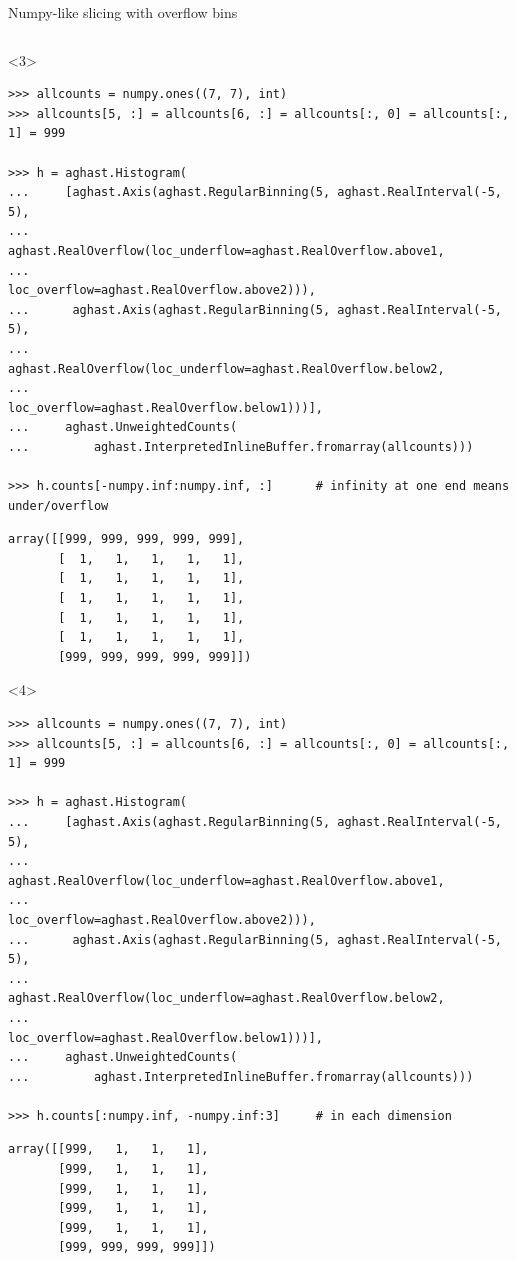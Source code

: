 \documentclass[aspectratio=169]{beamer}
\begin{document}
\begin{frame}[fragile]{Numpy-like slicing with overflow bins}
\begin{onlyenv}
\begin{verbatim}
\end{verbatim}
\end{onlyenv}
\begin{onlyenv}<3>
\begin{verbatim}
>>> allcounts = numpy.ones((7, 7), int)
>>> allcounts[5, :] = allcounts[6, :] = allcounts[:, 0] = allcounts[:, 1] = 999

>>> h = aghast.Histogram(
...     [aghast.Axis(aghast.RegularBinning(5, aghast.RealInterval(-5, 5),
...                  aghast.RealOverflow(loc_underflow=aghast.RealOverflow.above1,
...                                      loc_overflow=aghast.RealOverflow.above2))),
...      aghast.Axis(aghast.RegularBinning(5, aghast.RealInterval(-5, 5),
...                  aghast.RealOverflow(loc_underflow=aghast.RealOverflow.below2,
...                                      loc_overflow=aghast.RealOverflow.below1)))],
...     aghast.UnweightedCounts(
...         aghast.InterpretedInlineBuffer.fromarray(allcounts)))

>>> h.counts[-numpy.inf:numpy.inf, :]      # infinity at one end means under/overflow
\end{verbatim}
\begin{verbatim}
array([[999, 999, 999, 999, 999], 
       [  1,   1,   1,   1,   1], 
       [  1,   1,   1,   1,   1], 
       [  1,   1,   1,   1,   1], 
       [  1,   1,   1,   1,   1], 
       [  1,   1,   1,   1,   1], 
       [999, 999, 999, 999, 999]])
\end{verbatim}
\end{onlyenv}
\begin{onlyenv}<4>
\begin{verbatim}
>>> allcounts = numpy.ones((7, 7), int)
>>> allcounts[5, :] = allcounts[6, :] = allcounts[:, 0] = allcounts[:, 1] = 999

>>> h = aghast.Histogram(
...     [aghast.Axis(aghast.RegularBinning(5, aghast.RealInterval(-5, 5),
...                  aghast.RealOverflow(loc_underflow=aghast.RealOverflow.above1,
...                                      loc_overflow=aghast.RealOverflow.above2))),
...      aghast.Axis(aghast.RegularBinning(5, aghast.RealInterval(-5, 5),
...                  aghast.RealOverflow(loc_underflow=aghast.RealOverflow.below2,
...                                      loc_overflow=aghast.RealOverflow.below1)))],
...     aghast.UnweightedCounts(
...         aghast.InterpretedInlineBuffer.fromarray(allcounts)))

>>> h.counts[:numpy.inf, -numpy.inf:3]     # in each dimension
\end{verbatim}
\begin{verbatim}
array([[999,   1,   1,   1],
       [999,   1,   1,   1],
       [999,   1,   1,   1],
       [999,   1,   1,   1],
       [999,   1,   1,   1],
       [999, 999, 999, 999]])

\end{verbatim}
\end{onlyenv}
\end{frame}
\end{document}
